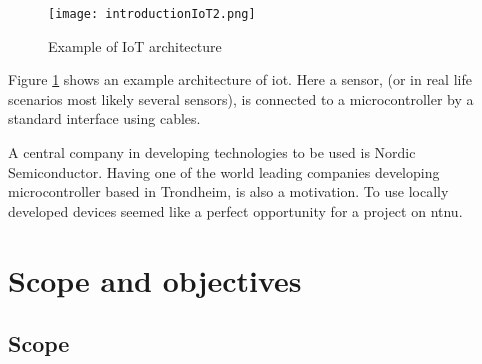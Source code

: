 \begin{figure}[ht]
    \centering
    \texttt{[image: introductionIoT2.png]}    
    \caption{Example of IoT architecture}
    \label{iotExampleArchitecture}
\end{figure}

\noindent Figure \ref{iotExampleArchitecture} shows an example architecture of \gls{iot}. Here a sensor, (or in real life scenarios most likely several sensors), is connected to a \gls{microcontroller} by a standard interface using cables. 




\noindent A central company in developing technologies to be used is Nordic Semiconductor. Having one of the world leading companies developing \gls{microcontroller} based in Trondheim, is also a motivation. To use locally developed devices seemed like a perfect opportunity for a project on \gls{ntnu}. 






\newpage



\section{Scope and objectives}

\subsection{Scope}

